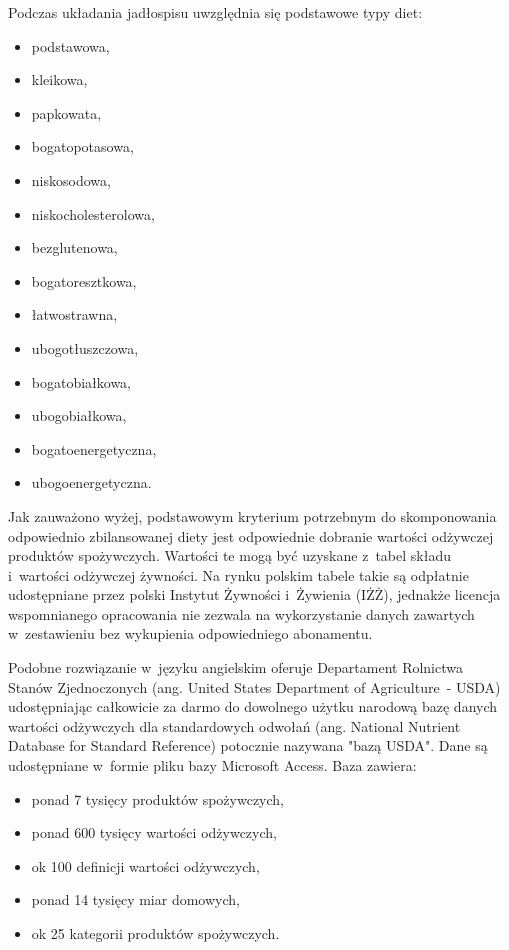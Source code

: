 \par
Podczas układania jadłospisu uwzględnia się podstawowe typy diet\cite{book:dietoterapia}:
\begin{itemize}
    \item podstawowa,
    \item kleikowa,
    \item papkowata,
    \item bogatopotasowa,
    \item niskosodowa,
    \item niskocholesterolowa,
    \item bezglutenowa,
    \item bogatoresztkowa,
    \item łatwostrawna,
    \item ubogotłuszczowa,
    \item bogatobiałkowa,
    \item ubogobiałkowa,
    \item bogatoenergetyczna,
    \item ubogoenergetyczna.
\end{itemize}

\par
Jak zauważono wyżej, podstawowym kryterium potrzebnym do skomponowania odpowiednio zbilansowanej diety jest odpowiednie dobranie wartości odżywczej produktów spożywczych.
Wartości te mogą być uzyskane z~tabel składu i~wartości odżywczej żywności.
Na rynku polskim tabele takie są odpłatnie udostępniane przez polski Instytut Żywności i~Żywienia (IŻŻ)\cite{book:tabele-wartosci-odzywczych},
jednakże licencja wspomnianego opracowania nie zezwala na wykorzystanie danych zawartych w~zestawieniu bez wykupienia odpowiedniego abonamentu\cite{url:izz-dostep-do-bazy}.

\par
Podobne rozwiązanie w~języku angielskim oferuje Departament Rolnictwa Stanów Zjednoczonych (ang. United States Department of Agriculture~- USDA) udostępniając całkowicie za darmo
do dowolnego użytku narodową bazę danych wartości odżywczych dla standardowych odwołań (ang. National Nutrient Database for Standard Reference)\cite{url:usda-sr-db} potocznie nazywana "bazą USDA".
Dane są udostępniane w~formie pliku bazy Microsoft Access. Baza zawiera:
\begin{itemize}
    \item ponad 7 tysięcy produktów spożywczych,
    \item ponad 600 tysięcy wartości odżywczych,
    \item ok 100 definicji wartości odżywczych,
    \item ponad 14 tysięcy miar domowych,
    \item ok 25 kategorii produktów spożywczych.
\end{itemize}

